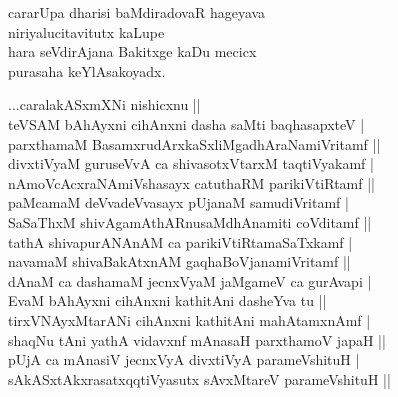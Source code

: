 \begin{entry}
\gl{}
\begin{shl}
cararUpa dharisi baMdiradovaR hageyava\\
niriyalucitavitutx kaLupe\\
hara seVdirAjana Bakitxge kaDu mecicx\\
purasaha keYlAsakoyadx.
\end{shl}
\end{entry}

\begin{entry}
\begin{shl}
...caralakASxmXNi nishicxnu ||\\
teVSAM bAhAyxni cihAnxni dasha saMti baqhasapxteV |\\
parxthamaM BasamxrudArxkaSxliMgadhAraNamiVritamf ||\\
divxtiVyaM guruseVvA ca shivasotxVtarxM taqtiVyakamf |\\
nAmoVcAcxraNAmiVshasayx catuthaRM parikiVtiRtamf ||\\
paMcamaM deVvadeVvasayx pUjanaM samudiVritamf |\\
SaSaThxM shivAgamAthARnusaMdhAnamiti coVditamf ||\\
tathA shivapurANAnAM ca parikiVtiRtamaSaTxkamf |\\
navamaM shivaBakAtxnAM gaqhaBoVjanamiVritamf ||\\
dAnaM ca dashamaM jecnxVyaM jaMgameV ca gurAvapi |\\
EvaM bAhAyxni cihAnxni kathitAni dasheYva tu ||\\
tirxVNAyxMtarANi cihAnxni kathitAni mahAtamxnAmf |\\
shaqNu tAni yathA vidavxnf mAnasaH parxthamoV japaH ||\\
pUjA ca mAnasiV jecnxVyA divxtiVyA parameVshituH |\\
sAkASxtAkxrasatxqqtiVyasutx sAvxMtareV parameVshituH ||
\end{shl}
\end{entry}

